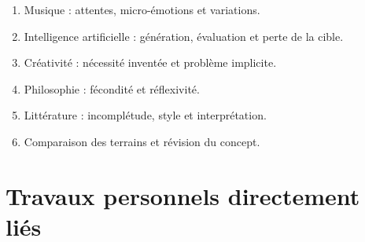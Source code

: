 \documentclass[11pt,a4paper]{article}
\begin{document}
\begin{enumerate}
    \begin{enumerate}
      \item Musique : attentes, micro-émotions et variations.
      \item Intelligence artificielle : génération, évaluation et perte de la
            cible.
      \item Créativité : nécessité inventée et problème implicite.
      \item Philosophie : fécondité et réflexivité.
      \item Littérature : incomplétude, style et interprétation.
      \item Comparaison des terrains et révision du concept.
    \end{enumerate}
\end{enumerate}

\section{Travaux personnels directement liés}
\end{document}
